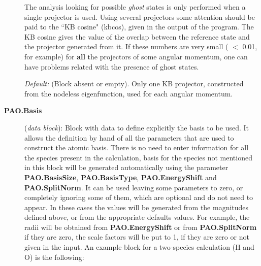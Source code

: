 \begin{description}
The analysis looking for possible {\it ghost} states is only performed when 
a single projector is used.
Using several projectors some attention should 
be paid to the ``KB cosine" (kbcos), given in the output of the program.
The KB cosine gives the value of the overlap between the 
reference state and the projector generated from it. 
If these 
numbers are very small ( $<$ 0.01, for example) 
for {\bf all} the projectors of some angular momentum, one can
have problems related with the presence of ghost states. 

{\it Default:} (Block absent or empty). Only one KB projector, constructed
from the nodeless eigenfunction, used
for each angular momentum. 
\noindent

     
\item[{\bf PAO.Basis}] ({\it data block}): 
Block with data to define explicitly the basis to be used. 
It allows the definition by hand of all the parameters that
are used to construct the atomic basis. There is no need
to enter information for all the species present in the calculation,
basis for the species not mentioned in this block will be 
generated automatically using the parameter {\bf PAO.BasisSize},
{\bf PAO.BasisType}, {\bf PAO.EnergyShift} and {\bf PAO.SplitNorm}.
It can be used 
leaving some parameters to zero, or completely ignoring some of them, 
which are optional and do not need to appear.
In these cases the values will be
generated from the magnitudes defined above, or from the appropriate 
defaults values. For example, the radii 
will be obtained from
{\bf PAO.EnergyShift} or from {\bf PAO.SplitNorm} if they are zero,  
the scale
factors will be put to 1, if they are zero or not given in the input. 
An example block for a two-species calculation (H and O) is the following:

\end{description}
